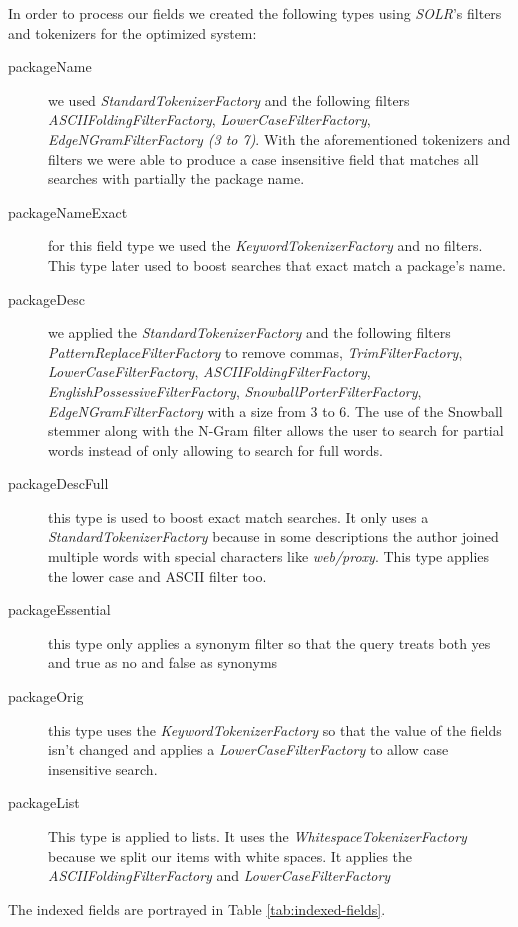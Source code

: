 In order to process our fields we created the following types using \emph{SOLR}'s filters\cite{solr_filters} and tokenizers\cite{solr_tokenizers} for the optimized system:
\begin{description}
    \item[packageName] we used \textit{StandardTokenizerFactory} and the following filters \textit{ASCIIFoldingFilterFactory}, \textit{LowerCaseFilterFactory}, \textit{EdgeNGramFilterFactory (3 to 7)}. With the aforementioned tokenizers and filters we were able to produce a case insensitive field that matches all searches with partially the package name.
    
    \item[packageNameExact] for this field type we used the \textit{KeywordTokenizerFactory} and no filters. This type later used to boost searches that exact match a package's name.
    
    \item[packageDesc] we applied the \textit{StandardTokenizerFactory} and the following filters \textit{PatternReplaceFilterFactory} to remove commas, \textit{TrimFilterFactory}, \textit{LowerCaseFilterFactory}, \textit{ASCIIFoldingFilterFactory}, \textit{EnglishPossessiveFilterFactory}, \textit{SnowballPorterFilterFactory}, \textit{EdgeNGramFilterFactory} with a size from 3 to 6. The use of the Snowball stemmer along with the N-Gram filter allows the user to search for partial words instead of only allowing to search for full words.
    
    \item[packageDescFull] this type is used to boost exact match searches. It only uses a \textit{StandardTokenizerFactory} because in some descriptions the author joined multiple words with special characters like \textit{web/proxy}. This type applies the lower case and ASCII filter too.
    
    \item[packageEssential] this type only applies a synonym filter so that the query treats both yes and true as no and false as synonyms
    
    \item[packageOrig] this type uses the \textit{KeywordTokenizerFactory} so that the value of the fields isn't changed and applies a \textit{LowerCaseFilterFactory} to allow case insensitive search.
    
    \item[packageList] This type is applied to lists. It uses the \textit{WhitespaceTokenizerFactory} because we split our items with white spaces. It applies the \textit{ASCIIFoldingFilterFactory} and \textit{LowerCaseFilterFactory} 
\end{description}

The indexed fields are portrayed in Table \ref{tab:indexed-fields}.



